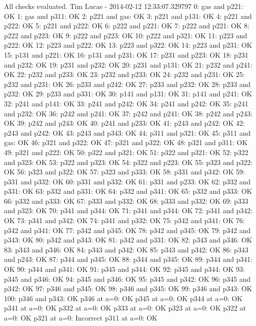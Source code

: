 All checks evaluated.
Tim Lucas - 2014-02-12 12:33:07.329797
0: gas and p221: OK
1: gas and p311: OK
2: p221 and gas: OK
3: p221 and p131: OK
4: p221 and p222: OK
5: p221 and p222: OK
6: p222 and p221: OK
7: p222 and p221: OK
8: p222 and p223: OK
9: p222 and p223: OK
10: p222 and p321: OK
11: p223 and p222: OK
12: p223 and p222: OK
13: p223 and p322: OK
14: p223 and p231: OK
15: p131 and p221: OK
16: p131 and p231: OK
17: p231 and p223: OK
18: p231 and p232: OK
19: p231 and p232: OK
20: p231 and p131: OK
21: p232 and p241: OK
22: p232 and p233: OK
23: p232 and p233: OK
24: p232 and p231: OK
25: p232 and p231: OK
26: p233 and p242: OK
27: p233 and p232: OK
28: p233 and p232: OK
29: p233 and p331: OK
30: p141 and p131: OK
31: p141 and p241: OK
32: p241 and p141: OK
33: p241 and p242: OK
34: p241 and p242: OK
35: p241 and p232: OK
36: p242 and p241: OK
37: p242 and p241: OK
38: p242 and p243: OK
39: p242 and p243: OK
40: p241 and p233: OK
41: p243 and p242: OK
42: p243 and p242: OK
43: p243 and p343: OK
44: p311 and p321: OK
45: p311 and gas: OK
46: p321 and p322: OK
47: p321 and p322: OK
48: p321 and p311: OK
49: p321 and p222: OK
50: p322 and p321: OK
51: p322 and p321: OK
52: p322 and p323: OK
53: p322 and p323: OK
54: p322 and p223: OK
55: p323 and p322: OK
56: p323 and p322: OK
57: p323 and p333: OK
58: p331 and p342: OK
59: p331 and p332: OK
60: p331 and p332: OK
61: p331 and p233: OK
62: p332 and p331: OK
63: p332 and p331: OK
64: p332 and p341: OK
65: p332 and p333: OK
66: p332 and p333: OK
67: p333 and p332: OK
68: p333 and p332: OK
69: p333 and p323: OK
70: p341 and p344: OK
71: p341 and p344: OK
72: p341 and p342: OK
73: p341 and p342: OK
74: p341 and p332: OK
75: p342 and p341: OK
76: p342 and p341: OK
77: p342 and p345: OK
78: p342 and p345: OK
79: p342 and p343: OK
80: p342 and p343: OK
81: p342 and p331: OK
82: p343 and p346: OK
83: p343 and p346: OK
84: p343 and p342: OK
85: p343 and p342: OK
86: p343 and p243: OK
87: p344 and p345: OK
88: p344 and p345: OK
89: p344 and p341: OK
90: p344 and p341: OK
91: p345 and p344: OK
92: p345 and p344: OK
93: p345 and p346: OK
94: p345 and p346: OK
95: p345 and p342: OK
96: p345 and p342: OK
97: p346 and p345: OK
98: p346 and p345: OK
99: p346 and p343: OK
100: p346 and p343: OK
p346 at a=0: OK
p345 at a=0: OK
p344 at a=0: OK
p341 at a=0: OK
p332 at a=0: OK
p333 at a=0: OK
p323 at a=0: OK
p322 at a=0: OK
p321 at a=0: Incorrect
p311 at a=0: OK
